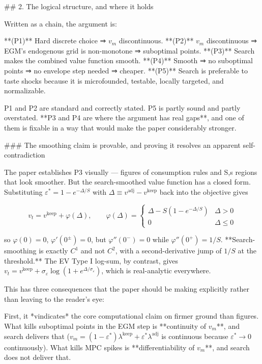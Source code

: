 ## 2. The logical structure, and where it holds

Written as a chain, the argument is:

**(P1)** Hard discrete choice ⇒ $v_m$ discontinuous. **(P2)** $v_m$ discontinuous ⇒ EGM's endogenous grid is non-monotone ⇒ suboptimal points. **(P3)** Search makes the combined value function smooth. **(P4)** Smooth ⇒ no suboptimal points ⇒ no envelope step needed ⇒ cheaper. **(P5)** Search is preferable to taste shocks because it is microfounded, testable, locally targeted, and normalizable.

P1 and P2 are standard and correctly stated. P5 is partly sound and partly overstated. **P3 and P4 are where the argument has real gaps**, and one of them is fixable in a way that would make the paper considerably stronger.

### The smoothing claim is provable, and proving it resolves an apparent self-contradiction

The paper establishes P3 visually — figures of consumption rules and S,s regions that look smoother. But the search-smoothed value function has a closed form. Substituting $\varepsilon^*=1-e^{-\Delta/S}$ with $\Delta \equiv v^{\text{adj}}-v^{\text{keep}}$ back into the objective gives

$$v_t = v^{\text{keep}} + \varphi(\Delta), \qquad \varphi(\Delta)=\begin{cases}\Delta - S\left(1-e^{-\Delta/S}\right) & \Delta>0\\ 0 & \Delta\le 0\end{cases}$$

so $\varphi(0)=0$, $\varphi'(0^\pm)=0$, but $\varphi''(0^-)=0$ while $\varphi''(0^+)=1/S$. **Search-smoothing is exactly $C^1$ and not $C^2$, with a second-derivative jump of $1/S$ at the threshold.** The EV Type I log-sum, by contrast, gives $v_t = v^{\text{keep}} + \sigma_\varepsilon\log(1+e^{\Delta/\sigma_\varepsilon})$, which is real-analytic everywhere.

This has three consequences that the paper should be making explicitly rather than leaving to the reader's eye:

First, it *vindicates* the core computational claim on firmer ground than figures. What kills suboptimal points in the EGM step is **continuity of $v_m$**, and search delivers that ($v_m=(1-\varepsilon^*)\lambda^{\text{keep}}+\varepsilon^*\lambda^{\text{adj}}$ is continuous because $\varepsilon^*\to 0$ continuously). What kills MPC spikes is **differentiability of $v_m$**, and search does not deliver that.

